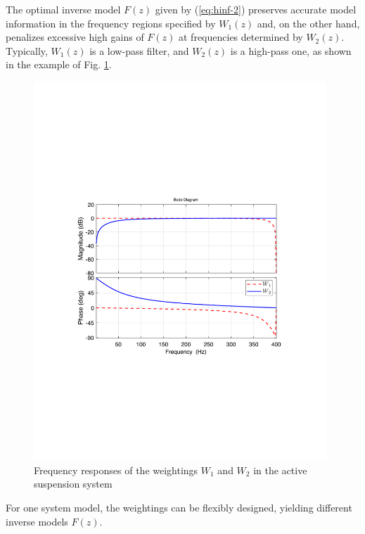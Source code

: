 \documentclass [11pt, proquest] {uwthesis}[2020/02/24]
\begin{document}
\noindent The optimal inverse model $F(z)$ given by (\ref{eq:hinf-2})
preserves accurate model information in the frequency regions specified
by $W_{1}(z)$ and, on the other hand, penalizes excessive high gains
of $F(z)$ at frequencies determined by $W_{2}(z)$. Typically, $W_{1}(z)$
is a low-pass filter, and $W_{2}(z)$ is a high-pass one, as shown
in the example of Fig. \ref{fig:Frequency-responseW1W2}. 
\begin{figure}
\begin{centering}
\includegraphics[width=11cm]{Model-inversion/W1W2}
\par\end{centering}
\caption{\label{fig:Frequency-responseW1W2}Frequency responses of the weightings
$W_{1}$ and $W_{2}$ in the active suspension system}
\end{figure}
For one system model, the weightings can be flexibly designed, yielding
different inverse models $F(z)$.
\end{document}
